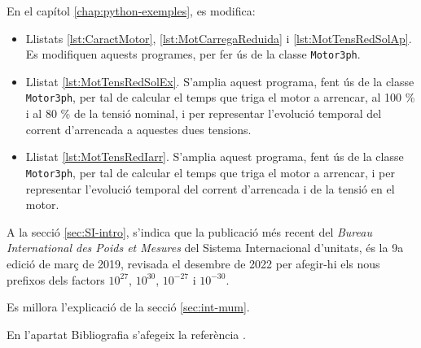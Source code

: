 En el capítol \ref{chap:python-exemples}, es modifica:
\begin{itemize}
	\item Llistats \ref{lst:CaractMotor}, \ref{lst:MotCarregaReduida} i \ref{lst:MotTensRedSolAp}. Es modifiquen aquests programes, per fer ús de la classe \texttt{Motor3ph}.
	\item Llistat \ref{lst:MotTensRedSolEx}. S'amplia aquest programa, fent ús de la classe \texttt{Motor3ph}, per tal de calcular el temps que triga el motor a arrencar, al 100 \% i al 80 \% de la tensió nominal, i per representar l'evolució temporal del corrent d'arrencada a aquestes dues tensions.	
	\item  Llistat \ref{lst:MotTensRedIarr}. S'amplia aquest programa, fent ús de la classe \texttt{Motor3ph}, per tal de calcular el temps que triga el motor a arrencar, i per representar l'evolució temporal del  corrent d'arrencada i de la tensió en el motor.
\end{itemize}

A la secció \ref{sec:SI-intro}, s'indica que la publicació més recent del \textit{Bureau 	International des Poids et Mesures} del Sistema Internacional d'unitats, és la  9a edició de març de 2019, revisada el desembre de 2022 per afegir-hi els nous prefixos dels factors $10^{27}$,  $10^{30}$,  $10^{-27}$ i  $10^{-30}$.

Es millora l'explicació de la secció \ref{sec:int-mum}.

En l'apartat Bibliografia s'afegeix la referència \cite{ALL}.